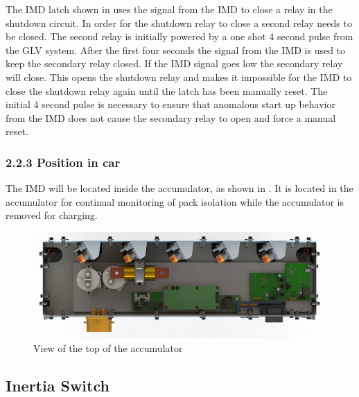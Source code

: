 \documentclass{article}
\begin{document}
The IMD latch shown in  uses the signal from the IMD to close a relay in the shutdown circuit. In order for the shutdown relay to close a second relay needs to be closed. The second relay is initially powered by a one shot 4 second pulse from the GLV system. After the first four seconds the signal from the IMD is used to keep the secondary relay closed. If the IMD signal goes low the secondary relay will close. This opens the shutdown relay and makes it impossible for the IMD to close the shutdown relay again until the latch has been manually reset. The initial 4 second pulse is necessary to ensure that anomalous start up behavior from the IMD does not cause the secondary relay to open and force a manual reset.


\subsubsection*{2.2.3 Position in car}

The IMD will be located inside the accumulator, as shown in . It is located in the accumulator for continual monitoring of pack isolation while the accumulator is removed for charging.

\begin{figure}[H]
    \centering 
    \includegraphics[width=1\textwidth]{Accum_top_view.jpg}
    \caption{View of the top of the accumulator}
    \label{fig:accumulator_top_view}
\end{figure}


\subsection{Inertia Switch}\label{inertia_switch}
\end{document}
